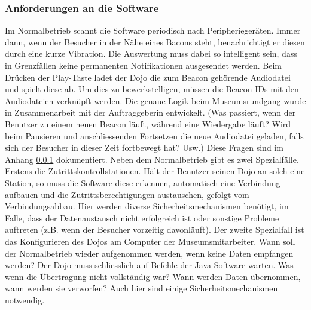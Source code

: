 \subsubsection{Anforderungen an die Software}
Im Normalbetrieb scannt die Software periodisch nach Peripheriegeräten. Immer dann, wenn der Besucher in der Nähe eines Bacons steht, benachrichtigt er diesen durch eine kurze Vibration. Die Auswertung muss dabei so intelligent sein, dass in Grenzfällen keine permanenten Notifikationen ausgesendet werden. Beim Drücken der Play-Taste ladet der Dojo die zum Beacon gehörende Audiodatei und spielt diese ab. Um dies zu bewerkstelligen, müssen die Beacon-IDs mit den Audiodateien verknüpft werden. 
Die genaue Logik beim Museumsrundgang wurde in Zusammenarbeit mit der Auftraggeberin entwickelt. (Was passiert, wenn der Benutzer zu einem neuen Beacon läuft, während eine Wiedergabe läuft? Wird beim Pausieren und anschliessenden Fortsetzen die neue Audiodatei geladen, falls sich der Besucher in dieser Zeit fortbewegt hat? Usw.) Diese Fragen sind im Anhang \ref{} dokumentiert.
Neben dem Normalbetrieb gibt es zwei Spezialfälle. Erstens die Zutrittskontrollstationen. Hält der Benutzer seinen Dojo an solch eine Station, so muss die Software diese erkennen, automatisch eine 
Verbindung aufbauen und die Zutrittsberechtigungen austauschen, gefolgt vom Verbindungsabbau. Hier werden diverse Sicherheitsmechanismen benötigt, im Falle, dass der Datenaustausch nicht erfolgreich ist oder sonstige Probleme auftreten (z.B. wenn der Besucher vorzeitig davonläuft). 
Der zweite Spezialfall ist das Konfigurieren des Dojos am Computer der Museumsmitarbeiter. Wann soll der Normalbetrieb wieder aufgenommen werden, wenn keine Daten empfangen werden? Der Dojo muss schliesslich auf Befehle der Java-Software warten. Was wenn die Übertragung nicht vollständig war? Wann werden Daten übernommen, wann werden sie verworfen? Auch hier sind einige Sicherheitsmechanismen notwendig.
